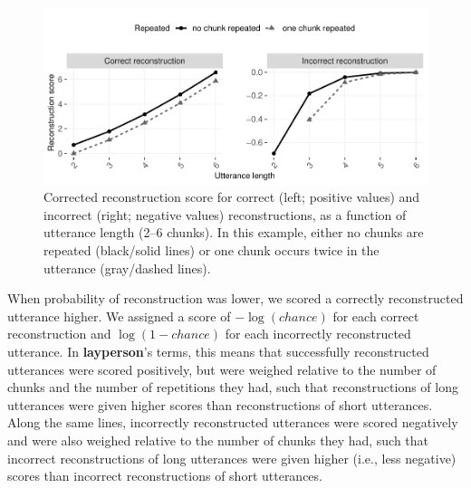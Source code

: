 \documentclass[
  english,
  man,mask,floatsintext]{apa6}
\begin{document}
\begin{figure}
\includegraphics[width=0.95\linewidth]{CBL-age_invariance_files/figure-latex/fig3-1} \caption{Corrected reconstruction score for correct (left; positive values) and incorrect (right; negative values) reconstructions, as a function of utterance length (2--6 chunks). In this example, either no chunks are repeated (black/solid lines) or one chunk occurs twice in the utterance (gray/dashed lines).}\label{fig:fig3}
\end{figure}

When probability of reconstruction was lower, we scored a correctly reconstructed utterance higher. We assigned a score of \(-\log(chance)\) for each correct reconstruction and \(\log(1-chance)\) for each incorrectly reconstructed utterance. In \textbf{layperson}'s terms, this means that successfully reconstructed utterances were scored positively, but were weighed relative to the number of chunks and the number of repetitions they had, such that reconstructions of long utterances were given higher scores than reconstructions of short utterances. Along the same lines, incorrectly reconstructed utterances were scored negatively and were also weighed relative to the number of chunks they had, such that incorrect reconstructions of long utterances were given higher (i.e., less negative) scores than incorrect reconstructions of short utterances.
\end{document}
